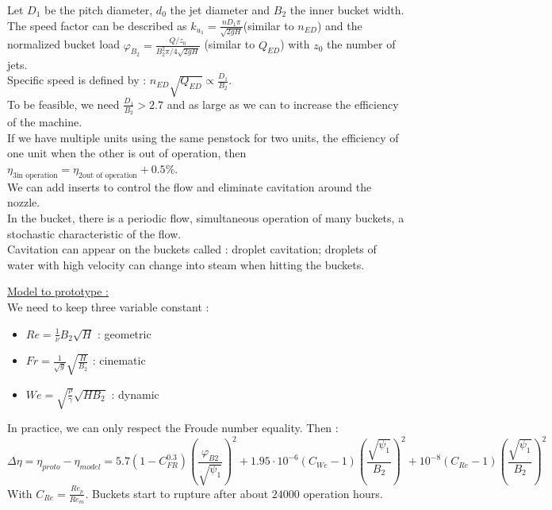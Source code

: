 \documentclass[../main.tex]{subfiles}
\begin{document}
Let $D_1$ be the pitch diameter, $d_0$ the jet diameter and $B_2$ the inner bucket width.\\

The speed factor can be described as $k_{u_1} = \frac{nD_1 \pi}{\sqrt{2gH}}$(similar to $n_{ED}$) and the normalized bucket load $\varphi_{B_2} = \frac{Q/z_0}{B_2^2 \pi/4 \sqrt{2gH}}$ (similar to $Q_{ED}$) with $z_0$ the number of jets.\\
Specific speed is defined by : $n_{ED} \sqrt{Q_{ED}} \propto \frac{D_1}{B_2}$.\\
To be feasible, we need $\frac{D_1}{B_2}>2.7$ and as large as we can to increase the efficiency of the machine.\\
If we have multiple units using the same penstock for two units, the efficiency of one unit when the other is out of operation, then $\eta_{3 \text{in operation}} = \eta_{2 \text{out of operation} } + 0.5\%$.\\
We can add inserts to control the flow and eliminate cavitation around the nozzle.\\

In the bucket, there is a periodic flow, simultaneous operation of many buckets, a stochastic characteristic of the flow.\\
Cavitation can appear on the buckets called : droplet cavitation; droplets of water with high velocity can change into steam when hitting the buckets.

\quad \underline{Model to prototype :}\\
We need to keep three variable constant : \begin{itemize}
    \item $Re = \frac{1}{\nu} B_2 \sqrt{H} $ : geometric
    \item $Fr = \frac{1}{\sqrt{g}} \sqrt{\frac{H}{B_2}}$ : cinematic
    \item $We = \sqrt{\frac{\rho}{\gamma}} \sqrt{H B_2}$ : dynamic
\end{itemize}
In practice, we can only respect the Froude number equality. Then : \begin{equation}
    \Delta \eta = \eta_{proto} - \eta_{model} = 5.7(1-C_{FR}^{0.3})(\frac{\varphi_{B2}}{\sqrt{\psi_1}})^2 + 1.95\cdot 10^{-6} (C_{We}-1) (\frac{\sqrt{\psi_1}}{B_2})^2 + 10^{-8} (C_{Re}-1) (\frac{\sqrt{\psi_1}}{B_2})^2
\end{equation}
With $C_{Re} = \frac{Re_p}{Re_m}$.
Buckets start to rupture after about $24000$ operation hours.\\
\end{document}
